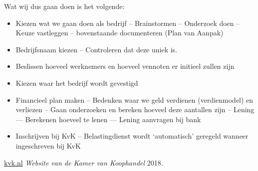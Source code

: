 \documentclass[11pt,oneside,a4paper,numbers=enddot]{report} %
\begin{document}
Wat wij dus gaan doen is het volgende:

\begin{itemize}
\item
  Kiezen wat we gaan doen als bedrijf
  -- Brainstormen
  -- Onderzoek doen
  -- Keuze vastleggen
  -- bovenstaande documenteren (Plan van Aanpak)
\item
  Bedrijfsnaam kiezen
  -- Controleren dat deze uniek is.
\item
  Beslissen hoeveel werknemers en
  hoeveel vennoten er initieel zullen zijn
\item
  Kiezen waar het bedrijf wordt gevestigd
\item
  Financieel plan maken
  -- Bedenken waar we geld verdienen (verdienmodel) en verliezen
  -- Gaan onderzoeken en bereken hoeveel deze aantallen zijn
  -- Lening
  --- Berekenen hoeveel te lenen
  --- Lening aanvragen bij bank
\item
  Inschrijven bij KvK -- Belastingdienst wordt `automatisch' geregeld
  wanneer ingeschreven bij KvK
\end{itemize}

\begin{thebibliography}{1}

 \href{https://www.kvk.nl}{kvk.nl} {\em Website van de Kamer van Koophandel}  2018.

\end{thebibliography}
\end{document}
